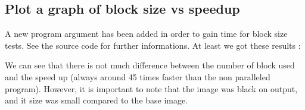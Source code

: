 \documentclass{article}
\begin{document}
\subsection{Plot a graph of block size vs speedup}
    A new program argument has been added in order to gain time for block size tests. See the source code for further informations. 
    \newline
    At least we got these results :
    \newline
    \newline
    We can see that there is not much difference between the number of block used and the speed up (always around 45 times faster than the non paralleled program).
    However, it is important to note that the image was black on output, and it size was small compared to the base image. 
    
\end{document}
